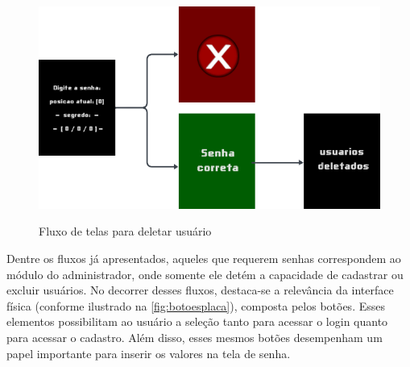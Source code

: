 \begin{figure}[h!]
    \centering
    \caption{Fluxo de telas para deletar usuário}
    \includegraphics[scale=1.8]{figuras/fluxo_deletar_usuario.png}
    \fonte{}%
    \label{fig:fluxosenha}
    \centering
\end{figure}

Dentre os fluxos já apresentados, aqueles que requerem 
senhas correspondem ao módulo do administrador, onde somente ele 
detém a capacidade de cadastrar ou excluir usuários. No decorrer 
desses fluxos, destaca-se a relevância da interface física 
(conforme ilustrado na \autoref{fig:botoesplaca}), 
composta pelos botões. Esses elementos possibilitam ao usuário a 
seleção tanto para acessar o login quanto para acessar o 
cadastro. Além disso, esses mesmos botões desempenham um 
papel importante para inserir os valores na tela de senha.

